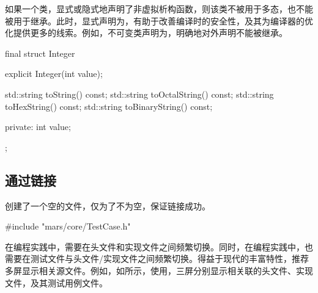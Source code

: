 \begin{content}
\begin{story}
\begin{content}
如果一个类，显式或隐式地声明了非虚拟析构函数，则该类不被用于多态，也不能被用于继承。此时，显式声明为，有助于改善编译时的安全性，及其为编译器的优化提供更多的线索。例如，不可变类声明为，明确地对外声明不能被继承。

\begin{leftbar}
 \begin{c++}
final struct Integer {
  explicit Integer(int value);

  std::string toString() const;
  std::string toOctalString() const;
  std::string toHexString() const;  
  std::string toBinaryString() const;    

private:
  int value;
};
 \end{c++}
\end{leftbar}

\end{content}

\end{story}

\subsection{通过链接}

创建了一个空的文件，仅为了不为空，保证链接成功。

\begin{leftbar}
 \begin{c++}[caption={\ttfamily{src/mars/core/TestCase.cc}}]
#include "mars/core/TestCase.h"
 \end{c++}
\end{leftbar}

\begin{story}
  \begin{center}
  \end{center}

\begin{content}

在\cpp{}编程实践中，需要在头文件和实现文件之间频繁切换。同时，在编程实践中，也需要在测试文件与头文件/实现文件之间频繁切换。得益于现代的丰富特性，推荐多屏显示相关源文件。例如，如所示，使用，三屏分别显示相关联的头文件、实现文件，及其测试用例文件。


\end{content}
\end{story}
\end{content}

